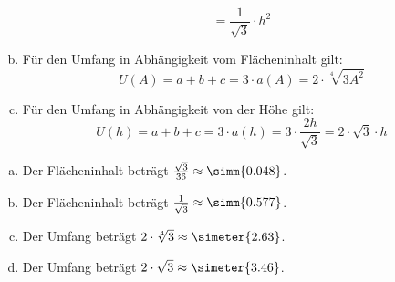 \begin{exercise}
\begin{enumerate}[a)]
\begin{equation*}
              =
              \frac{1}{\sqrt{3}}\cdot h^2
            \end{equation*}
      \item Für den Umfang in Abhängigkeit vom Flächeninhalt gilt:
            \begin{equation*}
              U(A)
              =
              a+b+c
              =
              3\cdot a(A)
              =
              2\cdot\sqrt[4]{3A^2}
            \end{equation*}
      \item Für den Umfang in Abhängigkeit von der Höhe gilt:
            \begin{equation*}
              U(h)
              =
              a+b+c
              =
              3\cdot a(h)
              =
              3\cdot\frac{2h}{\sqrt{3}}
              =
              2\cdot\sqrt{3}\cdot h
            \end{equation*}
    \end{enumerate}
  \fi
  \ifoutcome\outcome\par
    \begin{enumerate}[a)]
      \item Der Flächeninhalt beträgt $\frac{\sqrt{3}}{36}\approx\simm{0.048}$.
      \item Der Flächeninhalt beträgt $\frac{1}{\sqrt{3}}\approx\simm{0.577}$.
      \item Der Umfang beträgt $2\cdot\sqrt[4]{3}\approx\simeter{2.63}$.
      \item Der Umfang beträgt $2\cdot\sqrt{3}\approx\simeter{3.46}$.
    \end{enumerate}
  \fi
\end{exercise}
